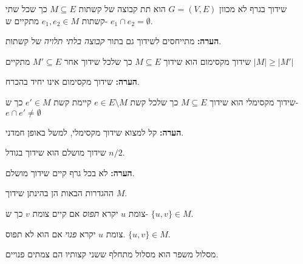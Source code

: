 \begin{definition}[שידוך]
שידוך בגרף לא מכוון
$G = (V, E)$
הוא תת קבוצה של קשתות 
$M \subseteq E$
כך שכל שתי קשתות
$e_1, e_2 \in M$
מתקיים ש-
$e_1 \cap e_2 = \emptyset$.
\end{definition}
\textbf{הערה:}
מתייחסים לשידוך גם בתור 
\emph{קבוצה בלתי תלויה}
של קשתות.

\begin{definition}
שידוך מקסימום הוא שידוך 
$M \subseteq E$
כך שלכל שידוך אחר
$M' \subseteq E$
מתקיים
$|M| \geq |M'|$
\end{definition}

\textbf{הערה:}
שידוך מקסימום אינו יחיד בהכרח.

\begin{definition}
שידוך מקסימלי הוא שידוך 
$M \subseteq E$
כך שלכל קשת 
$e \in E \setminus M$
קיימת קשת 
$e' \in M$
כך ש-
$e \cap e' \neq \emptyset$
\end{definition}

\textbf{הערה:}
קל למצוא שידוך מקסימלי, למשל באופן חמדני.

\begin{definition}
שידוך מושלם הוא שידוך בגודל 
$n/2$.
\end{definition}
\textbf{הערה:}
לא בכל גרף קיים שידוך מושלם.

ההגדרות הבאות הן בהינתן שידוך $M$.
\begin{definition}
צומת $u$ יקרא
\emph{תפוס}
אם קיים צומת $v$ כך ש-
$\{u, v\} \in M$.
\end{definition}

\begin{definition}
צומת $u$ יקרא
\emph{פנוי}
אם הוא לא תפוס.
$\{u, v\} \in M$.
\end{definition}

\begin{definition}[מסלול מתחלף]
מסלול (פשוט) 
$(v_1, \ldots, v_l)$
יקרא
\emph{מתחלף}
אם לכל 
$1 \leq i < l$
מתקיים ש-
$|\{e_i, e_{i + 1}}\} \cap M| = 1$
כאשר
$e_i = \{v_i, v_{i + 1}\}$.
\end{definition}

\begin{definition}
מסלול משפר הוא מסלול מתחלף ששני קצותיו הם צמתים פנויים.
\end{definition}

\begin{figure}[h]
\centering

\end{figure}
